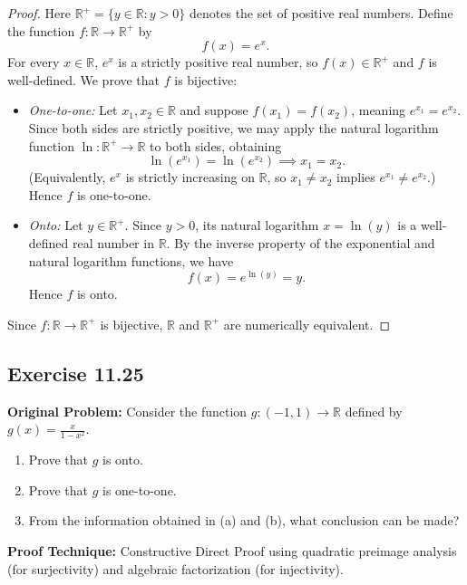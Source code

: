 \documentclass[11pt, letterpaper]{article}
\theoremstyle{definition}
\theoremstyle{remark}
\begin{document}
\begin{proof}
Here $\mathbb{R}^+ = \{y \in \mathbb{R} : y > 0\}$ denotes the set of positive real numbers. Define the function $f : \mathbb{R} \to \mathbb{R}^+$ by
\[
f(x) = e^x.
\]
For every $x \in \mathbb{R}$, $e^x$ is a strictly positive real number, so $f(x) \in \mathbb{R}^+$ and $f$ is well-defined. We prove that $f$ is bijective:
\begin{itemize}
    \item \emph{One-to-one:} Let $x_1, x_2 \in \mathbb{R}$ and suppose $f(x_1) = f(x_2)$, meaning $e^{x_1} = e^{x_2}$. Since both sides are strictly positive, we may apply the natural logarithm function $\ln : \mathbb{R}^+ \to \mathbb{R}$ to both sides, obtaining
    \[
    \ln(e^{x_1}) = \ln(e^{x_2}) \implies x_1 = x_2.
    \]
    (Equivalently, $e^x$ is strictly increasing on $\mathbb{R}$, so $x_1 \neq x_2$ implies $e^{x_1} \neq e^{x_2}$.) Hence $f$ is one-to-one.
    \item \emph{Onto:} Let $y \in \mathbb{R}^+$. Since $y > 0$, its natural logarithm $x = \ln(y)$ is a well-defined real number in $\mathbb{R}$. By the inverse property of the exponential and natural logarithm functions, we have
    \[
    f(x) = e^{\ln(y)} = y.
    \]
    Hence $f$ is onto.
\end{itemize}
Since $f : \mathbb{R} \to \mathbb{R}^+$ is bijective, $\mathbb{R}$ and $\mathbb{R}^+$ are numerically equivalent.
\end{proof}

\subsection{Exercise 11.25}

\textbf{Original Problem:} Consider the function $g : (-1, 1) \to \mathbb{R}$ defined by $g(x) = \frac{x}{1 - x^2}$.
\begin{enumerate}[label=(\alph*)]
    \item Prove that $g$ is onto.
    \item Prove that $g$ is one-to-one.
    \item From the information obtained in (a) and (b), what conclusion can be made?
\end{enumerate}

\textbf{Proof Technique:} Constructive Direct Proof using quadratic preimage analysis (for surjectivity) and algebraic factorization (for injectivity).
\end{document}
